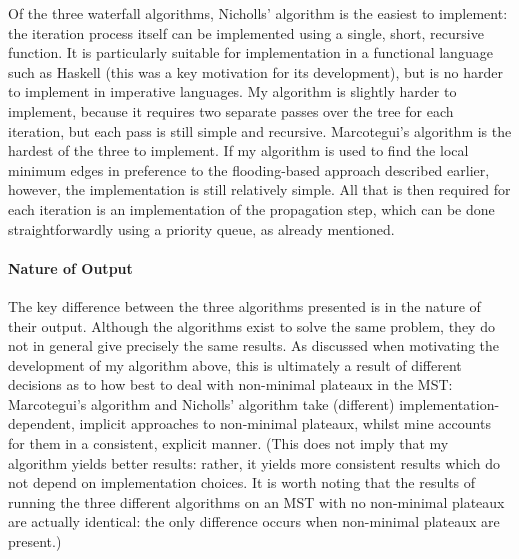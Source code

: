 Of the three waterfall algorithms, Nicholls' algorithm is the easiest to implement: the iteration process itself can be implemented using a single, short, recursive function. It is particularly suitable for implementation in a functional language such as Haskell (this was a key motivation for its development), but is no harder to implement in imperative languages. My algorithm is slightly harder to implement, because it requires two separate passes over the tree for each iteration, but each pass is still simple and recursive. Marcotegui's algorithm is the hardest of the three to implement. If my algorithm is used to find the local minimum edges in preference to the flooding-based approach described earlier, however, the implementation is still relatively simple. All that is then required for each iteration is an implementation of the propagation step, which can be done straightforwardly using a priority queue, as already mentioned.

\paragraph{Nature of Output}

The key difference between the three algorithms presented is in the nature of their output. Although the algorithms exist to solve the same problem, they do not in general give precisely the same results. As discussed when motivating the development of my algorithm above, this is ultimately a result of different decisions as to how best to deal with non-minimal plateaux in the MST: Marcotegui's algorithm and Nicholls' algorithm take (different) implementation-dependent, implicit approaches to non-minimal plateaux, whilst mine accounts for them in a consistent, explicit manner. (This does not imply that my algorithm yields better results: rather, it yields more consistent results which do not depend on implementation choices. It is worth noting that the results of running the three different algorithms on an MST with no non-minimal plateaux are actually identical: the only difference occurs when non-minimal plateaux are present.)


